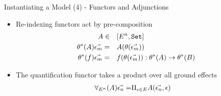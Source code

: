\begin{frame}{Instantiating a Model (4) - Functors and Adjunctions}
\begin{itemize}
    \item Re-indexing functors act by pre-composition
    \begin{align*}
        A\in&\quad [E^n, \texttt{Set}]\\
        \theta^*(A) \vec{\epsilon_m} =&\quad  A(\theta(\vec{\epsilon_m}))\\
        \theta^*(f) \vec{\epsilon_m} =&\quad f(\theta(\vec{\epsilon_m})): \theta^*(A) \rightarrow \theta^*(B)\\
    \end{align*}
    \item The quantification functor takes a product over all ground effects
    \begin{align*}
        \forall_{E^n}(A)\vec{\epsilon_n} =&\Pi_{\epsilon\in E}{A(\vec{\epsilon_n}, \epsilon)}
    \end{align*}
\end{itemize}
    


    

\end{frame}